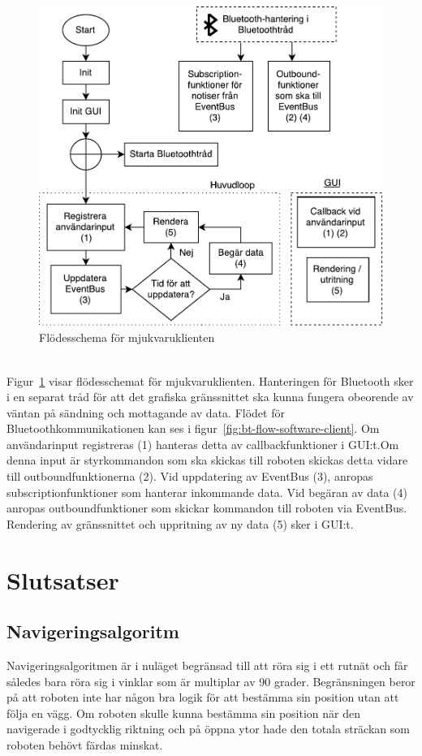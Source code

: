 \documentclass{article}
\begin{document}
\begin{figure}[H]
\centering
\includegraphics[scale=0.55]{software_client_flowchart}
\caption{Flödesschema för mjukvaruklienten}
\label{fig:software_client_flowchart}
\end{figure}
\ \\
Figur~\ref{fig:software_client_flowchart} visar flödesschemat för mjukvaruklienten. Hanteringen för Bluetooth sker i en separat tråd för att det grafiska gränssnittet ska kunna fungera obeorende av väntan på sändning och mottagande av data. Flödet för Bluetoothkommunikationen kan ses i figur~\ref{fig:bt-flow-software-client}. Om användarinput registreras (1) hanteras detta av callbackfunktioner i GUI:t.Om denna input är styrkommandon som ska skickas till roboten skickas detta vidare till outboundfunktionerna (2). Vid uppdatering av EventBus (3), anropas subscriptionfunktioner som hanterar inkommande data. Vid begäran av data (4) anropas outboundfunktioner som skickar kommandon till roboten via EventBus. Rendering av gränssnittet och uppritning av ny data (5) sker i GUI:t.

\clearpage
\section{Slutsatser}

\subsection{Navigeringsalgoritm}
\label{sec:slutsatser_navigering}
Navigeringsalgoritmen är i nuläget begränsad till att röra sig i ett rutnät och får således bara röra sig i vinklar som är multiplar av 90 grader. Begränsningen beror på att roboten inte har någon bra logik för att bestämma sin position utan att följa en vägg. Om roboten skulle kunna bestämma sin position när den navigerade i godtycklig riktning och på öppna ytor hade den totala sträckan som roboten behövt färdas minskat.
\end{document}
